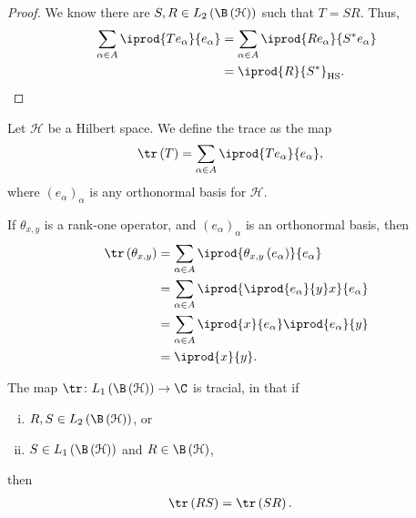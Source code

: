 \documentclass[10pt]{mypackage}
\DeclareMathOperator{\hs}{HS}
\begin{document}
\begin{proof}
  We know there are $S,R\in L_2\left( \B\left( \mathcal{H} \right) \right)$ such that $T = SR$. Thus,
  \begin{align*}
    \sum_{\alpha\in A} \iprod{Te_{\alpha}}{e_{\alpha}} &= \sum_{\alpha \in A} \iprod{Re_{\alpha}}{S^{\ast}e_{\alpha}}\\
                                                       &= \iprod{R}{S^{\ast}}_{\hs}.
  \end{align*}
\end{proof}
\begin{definition}
  Let $\mathcal{H}$ be a Hilbert space. We define the trace as the map
  \begin{align*}
    \tr\left( T \right) &= \sum_{\alpha \in A} \iprod{Te_{\alpha}}{e_{\alpha}},
  \end{align*}
  where $\left( e_{\alpha} \right)_{\alpha}$ is any orthonormal basis for $\mathcal{H}$.
\end{definition}
\begin{example}
  If $\theta_{x,y}$ is a rank-one operator, and $\left( e_{\alpha} \right)_{\alpha}$ is an orthonormal basis, then
  \begin{align*}
    \tr\left( \theta_{x,y} \right) &= \sum_{\alpha \in A} \iprod{\theta_{x,y}\left( e_{\alpha} \right)}{e_{\alpha}}\\
                                   &= \sum_{\alpha \in A} \iprod{ \iprod{e_{\alpha}}{y}x }{e_{\alpha}}\\
                                   &= \sum_{\alpha \in A} \iprod{x}{e_{\alpha}} \iprod{e_{\alpha}}{y}\\
                                   &= \iprod{x}{y}.
  \end{align*}
\end{example}
\begin{proposition}
  The map $\tr\colon L_1\left( \B\left( \mathcal{H} \right) \right)\rightarrow \C$ is tracial, in that if
  \begin{enumerate}[(i)]
    \item $R,S\in L_2\left( \B\left( \mathcal{H} \right) \right)$, or
    \item $S\in L_1\left( \B\left( \mathcal{H} \right) \right)$ and $R\in \B\left( \mathcal{H} \right)$,
  \end{enumerate}
  then 
  \begin{align*}
    \tr\left( RS \right) &= \tr\left( SR \right).
  \end{align*}
\end{proposition}
\end{document}
